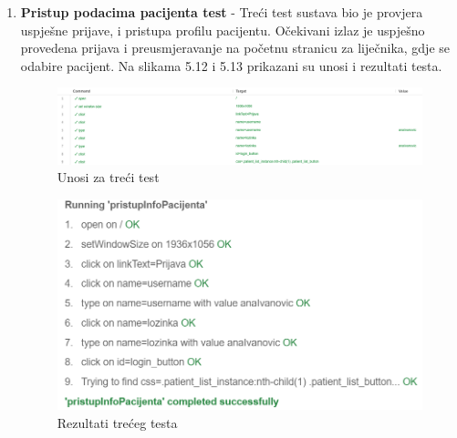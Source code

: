 \begin{enumerate}
			 	\clearpage
			 	\item \textbf{Pristup podacima pacijenta test} - Treći test sustava bio je provjera uspješne prijave, i pristupa profilu pacijentu. Očekivani izlaz je uspješno provedena prijava i preusmjeravanje na početnu stranicu za liječnika, gdje se odabire pacijent. Na slikama 5.12 i 5.13 prikazani su unosi i rezultati testa.
			 	\begin{figure}[H]
			 		\includegraphics[scale=0.3]{slike/testSustava6.PNG} %
			 		\centering
			 		\caption{Unosi za treći test}
			 		\label{fig:testsustava5}
			 	\end{figure}
			 	\begin{figure}[H]
			 		\includegraphics[scale=0.6]{slike/testSustava5.PNG} %
			 		\centering
			 		\caption{Rezultati trećeg testa}
			 		\label{fig:testsustava6}
			 	\end{figure}
			 	\clearpage
			 	

\end{enumerate}
